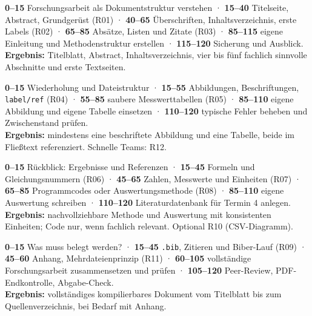 \documentclass[11pt,a4paper,parskip=half]{scrartcl} %
\begin{document}
\begin{tcolorbox}[colback=SFNlight,colframe=SFNteal,title={Termin 1 · Das lesbare Dokument (120 Min.)},fonttitle=\bfseries]
\textbf{0--15} Forschungsarbeit als Dokumentstruktur verstehen ·
\textbf{15--40} Titelseite, Abstract, Grundgerüst (R01) ·
\textbf{40--65} Überschriften, Inhaltsverzeichnis, erste Labels (R02) ·
\textbf{65--85} Absätze, Listen und Zitate (R03) ·
\textbf{85--115} eigene Einleitung und Methodenstruktur erstellen ·
\textbf{115--120} Sicherung und Ausblick.\\
\textbf{Ergebnis:} Titelblatt, Abstract, Inhaltsverzeichnis, vier bis fünf
fachlich sinnvolle Abschnitte und erste Textseiten.
\end{tcolorbox}
\begin{tcolorbox}[colback=SFNlight,colframe=SFNteal,title={Termin 2 · Ergebnisse sichtbar machen (120 Min.)},fonttitle=\bfseries]
\textbf{0--15} Wiederholung und Dateistruktur ·
\textbf{15--55} Abbildungen, Beschriftungen, \texttt{label/ref} (R04) ·
\textbf{55--85} saubere Messwerttabellen (R05) ·
\textbf{85--110} eigene Abbildung und eigene Tabelle einsetzen ·
\textbf{110--120} typische Fehler beheben und Zwischenstand prüfen.\\
\textbf{Ergebnis:} mindestens eine beschriftete Abbildung und eine Tabelle,
beide im Fließtext referenziert. Schnelle Teams: R12.
\end{tcolorbox}
\begin{tcolorbox}[colback=SFNlight,colframe=SFNteal,title={Termin 3 · Wissenschaftliche Inhalte setzen (120 Min.)},fonttitle=\bfseries]
\textbf{0--15} Rückblick: Ergebnisse und Referenzen ·
\textbf{15--45} Formeln und Gleichungsnummern (R06) ·
\textbf{45--65} Zahlen, Messwerte und Einheiten (R07) ·
\textbf{65--85} Programmcodes oder Auswertungsmethode (R08) ·
\textbf{85--110} eigene Auswertung schreiben ·
\textbf{110--120} Literaturdatenbank für Termin 4 anlegen.\\
\textbf{Ergebnis:} nachvollziehbare Methode und Auswertung mit konsistenten
Einheiten; Code nur, wenn fachlich relevant. Optional R10 (CSV-Diagramm).
\end{tcolorbox}
\begin{tcolorbox}[colback=SFNlight,colframe=SFNteal,title={Termin 4 · Quellen, Anhang, Abschluss (120 Min.)},fonttitle=\bfseries]
\textbf{0--15} Was muss belegt werden? ·
\textbf{15--45} \texttt{.bib}, Zitieren und Biber-Lauf (R09) ·
\textbf{45--60} Anhang, Mehrdateienprinzip (R11) ·
\textbf{60--105} vollständige Forschungsarbeit zusammensetzen und prüfen ·
\textbf{105--120} Peer-Review, PDF-Endkontrolle, Abgabe-Check.\\
\textbf{Ergebnis:} vollständiges kompilierbares Dokument vom Titelblatt bis
zum Quellenverzeichnis, bei Bedarf mit Anhang.
\end{tcolorbox}
\end{document}
